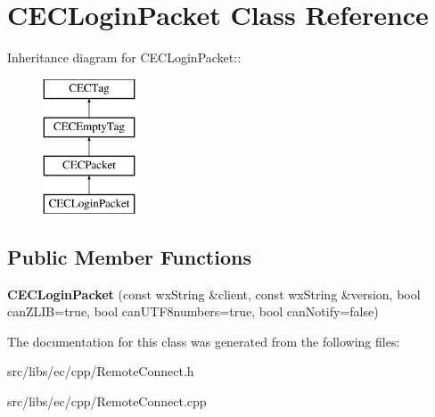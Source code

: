 \section{CECLoginPacket Class Reference}
\label{classCECLoginPacket}
Inheritance diagram for CECLoginPacket::\begin{figure}[H]
\begin{center}
\leavevmode
\includegraphics[height=4cm]{classCECLoginPacket}
\end{center}
\end{figure}
\subsection*{Public Member Functions}
\begin{DoxyCompactItemize}
\item 
{\bfseries CECLoginPacket} (const wxString \&client, const wxString \&version, bool canZLIB=true, bool canUTF8numbers=true, bool canNotify=false)\label{classCECLoginPacket_a9e462d6c0a67036a008acd65b645c033}

\end{DoxyCompactItemize}


The documentation for this class was generated from the following files:\begin{DoxyCompactItemize}
\item 
src/libs/ec/cpp/RemoteConnect.h\item 
src/libs/ec/cpp/RemoteConnect.cpp\end{DoxyCompactItemize}
